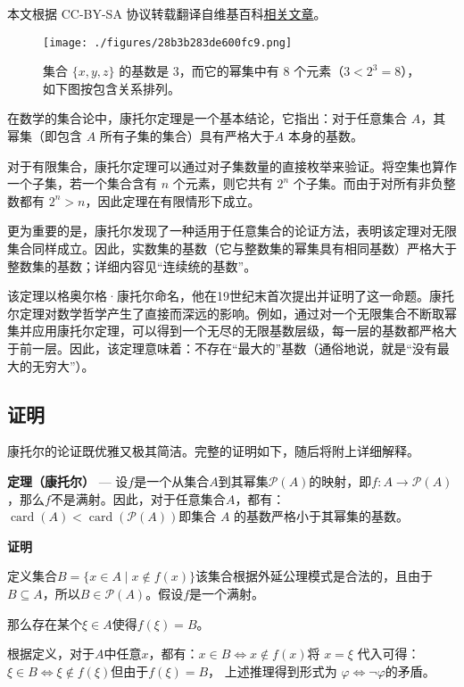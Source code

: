 
本文根据 CC-BY-SA 协议转载翻译自维基百科\href{https://en.wikipedia.org/wiki/Cantor\%27s_theorem}{相关文章}。

\begin{figure}[ht]
\centering
\texttt{[image: ./figures/28b3b283de600fc9.png]}
\caption{集合 $\{x, y, z\}$ 的基数是 3，而它的幂集中有 8 个元素（$3 < 2^3 = 8$），如下图按包含关系排列。} \label{fig_KTDL_1}
\end{figure}
在数学的集合论中，康托尔定理是一个基本结论，它指出：对于任意集合 $A$，其幂集（即包含 $A$ 所有子集的集合）具有严格大于$A$ 本身的基数。

对于有限集合，康托尔定理可以通过对子集数量的直接枚举来验证。将空集也算作一个子集，若一个集合含有 $n$ 个元素，则它共有 $2^n$ 个子集。而由于对所有非负整数都有 $2^n > n$，因此定理在有限情形下成立。

更为重要的是，康托尔发现了一种适用于任意集合的论证方法，表明该定理对无限集合同样成立。因此，实数集的基数（它与整数集的幂集具有相同基数）严格大于整数集的基数；详细内容见“连续统的基数”。

该定理以格奥尔格·康托尔命名，他在19世纪末首次提出并证明了这一命题。康托尔定理对数学哲学产生了直接而深远的影响。例如，通过对一个无限集合不断取幂集并应用康托尔定理，可以得到一个无尽的无限基数层级，每一层的基数都严格大于前一层。因此，该定理意味着：不存在“最大的”基数（通俗地说，就是“没有最大的无穷大”）。
\subsection{证明}
康托尔的论证既优雅又极其简洁。完整的证明如下，随后将附上详细解释。

\textbf{定理（康托尔）} — 设$f$是一个从集合$A$到其幂集$\mathcal{P}(A)$的映射，即$
f: A \to \mathcal{P}(A)$，那么$f$不是满射。因此，对于任意集合$A$，都有：
$\operatorname{card}(A) < \operatorname{card}(\mathcal{P}(A))$即集合 $A$ 的基数严格小于其幂集的基数。

\textbf{证明}

定义集合$B = \{x \in A \mid x \notin f(x)\}$该集合根据外延公理模式是合法的，且由于 $B \subseteq A$，所以$B \in \mathcal{P}(A)$。假设$f$是一个满射。

那么存在某个$\xi \in A$使得$f(\xi) = B$。

根据定义，对于$A$中任意$x$，都有：$x \in B \iff x \notin f(x)$将 $x = \xi$ 代入可得：$\xi \in B \iff \xi \notin f(\xi)$但由于$f(\xi) = B$，  
上述推理得到形式为  $\varphi \Leftrightarrow \lnot \varphi$的矛盾。

